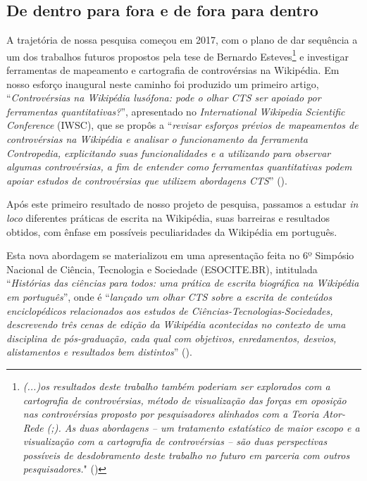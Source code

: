\subsection{De dentro para fora e de fora para dentro}

A trajetória de nossa pesquisa começou em 2017, com o plano de dar sequência a um dos trabalhos futuros propostos pela tese de Bernardo Esteves\footnote{\textit{(...)os resultados deste trabalho também poderiam ser explorados com a cartografia de controvérsias, método de visualização das forças em oposição nas controvérsias proposto por pesquisadores alinhados com a Teoria Ator-Rede (\cite{venturini_diving_2010};\citeyear{venturini_building_2012}). As duas abordagens – um tratamento estatístico de maior escopo e a visualização com a cartografia de controvérsias – são duas perspectivas possíveis de desdobramento deste trabalho no futuro em parceria com outros pesquisadores.}" (\cite[p.296]{esteves_as_2014})} e investigar ferramentas de mapeamento e cartografia de controvérsias na Wikipédia. Em nosso esforço inaugural neste caminho foi produzido um primeiro artigo, ``\textit{Controvérsias na Wikipédia lusófona: pode o olhar CTS ser apoiado por ferramentas quantitativas?}'', apresentado no \textit{International Wikipedia Scientific Conference} (IWSC), que se propôs a ``\textit{revisar esforços prévios de mapeamentos de controvérsias na Wikipédia e analisar o funcionamento da ferramenta Contropedia, explicitando suas funcionalidades e a utilizando para observar algumas controvérsias, a fim de entender como ferramentas quantitativas podem apoiar estudos de controvérsias que utilizem abordagens CTS}'' (\cite[p.1]{de_andrade_controversias_2017}).

Após este primeiro resultado de nosso projeto de pesquisa, passamos a estudar \textit{in loco} diferentes práticas de escrita na Wikipédia, suas barreiras e resultados obtidos, com ênfase em possíveis peculiaridades da Wikipédia em português. 

Esta nova abordagem se materializou em uma apresentação feita no 6º Simpósio Nacional de Ciência, Tecnologia e Sociedade (ESOCITE.BR), intitulada “\textit{Histórias das ciências para todos: uma prática de escrita biográfica na Wikipédia em português}”, onde é “\textit{lançado um olhar CTS sobre a escrita de conteúdos enciclopédicos relacionados aos estudos de Ciências-Tecnologias-Sociedades, descrevendo três cenas de edição da Wikipédia acontecidas no contexto de uma disciplina de pós-graduação, cada qual com objetivos, enredamentos, desvios, alistamentos e resultados bem distintos}” (\cite{andrade_historias_2017}).

